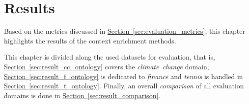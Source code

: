 \chapter{Results}\label{chap:results}



Based on the metrics discussed in \hyperref[sec:evaluation_metrics]{Section~\ref*{sec:evaluation_metrics}}, this chapter highlights the results of the context enrichment methods.

This chapter is divided along the used datasets for evaluation, that is, \hyperref[sec:result_cc_ontology]{Section~\ref*{sec:result_cc_ontology}} covers the \emph{climate~change} domain, \hyperref[sec:result_f_ontology]{Section~\ref*{sec:result_f_ontology}} is dedicated to \emph{finance} and \emph{tennis} is handled in \hyperref[sec:result_t_ontology]{Section~\ref*{sec:result_t_ontology}}. Finally, an overall \emph{comparison} of all evaluation domains is done in \hyperref[sec:result_comparison]{Section~\ref*{sec:result_comparison}}.


